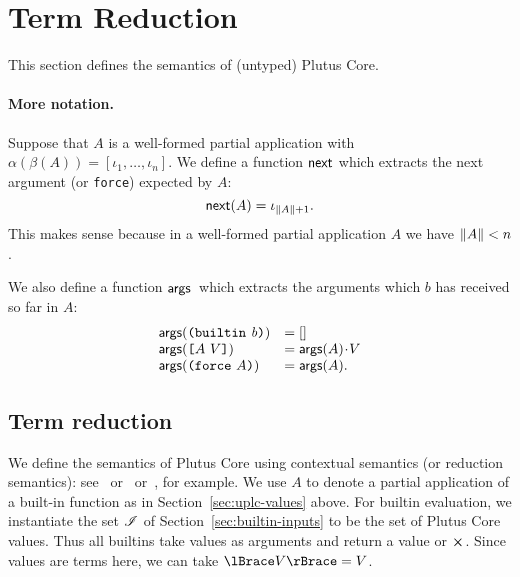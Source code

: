 \section{Term Reduction}
\label{sec:reduction}

This section defines the semantics of (untyped) Plutus Core.




\paragraph{More notation.} Suppose that $A$ is a well-formed partial application with
$\alpha(\beta(A)) = [\iota_1,\ldots,\iota_n]$.  We define a function $\operatorname{\mathsf{next}}$
which extracts the next argument (or \texttt{force}) expected by $A$:
$$
    \operatorname{\mathsf{next}}(A) = \iota_{\lVert A \rVert+1}.
$$
\noindent%
This makes sense because in a well-formed partial application $A$ we have
$\lVert A \rVert < n$.

\medskip
\noindent We also define a function $\operatorname{\mathbf{\mathsf{args}}}{}$ which extracts the arguments which
$b$ has received so far in $A$:
$$
\begin{array}{ll}
  \operatorname{\mathbf{\mathsf{args}}}(\texttt{(} \texttt{builtin} ~ \mathit{b} \texttt{)}) &= []\\
  \operatorname{\mathbf{\mathsf{args}}}(\texttt{[} A ~ V \texttt{]}) &= \operatorname{\mathbf{\mathsf{args}}}(A)\mathbin{\!\cdot\!} V\\
  \operatorname{\mathbf{\mathsf{args}}}(\texttt{(} \texttt{force} ~ A \texttt{)})   &= \operatorname{\mathbf{\mathsf{args}}}(A).\\
\end{array}
$$%

\subsection{Term reduction}

    
We define the semantics of Plutus Core using contextual semantics (or reduction
semantics): see~\cite{Felleisen-Hieb} or~\cite{Felleisen-Semantics-Engineering}
or~\cite[5.3]{Harper:PFPL}, for example.  We use $A$ to denote a partial
application of a built-in function as in Section~\ref{sec:uplc-values} above.
For builtin evaluation, we instantiate the set $\mathscr{I}$ of
Section~\ref{sec:builtin-inputs} to be the set of Plutus Core values.  Thus all
builtins take values as arguments and return a value or $\errorX$.  Since values
are terms here, we can take $\reify{V} = V$.

